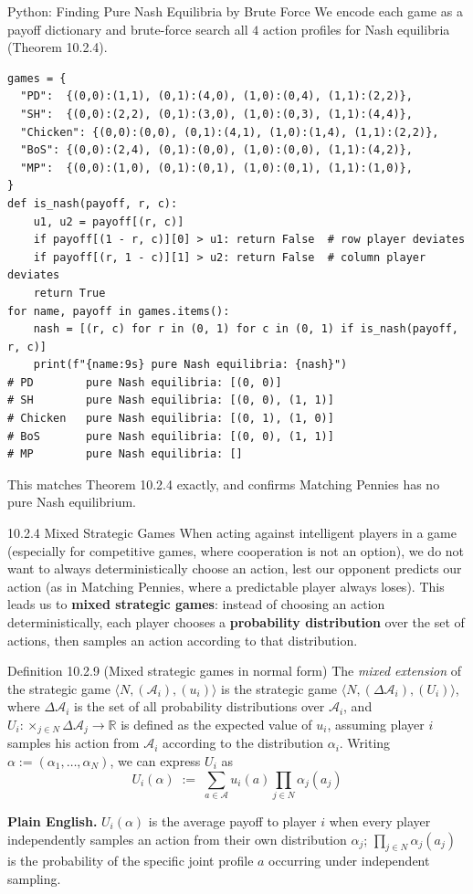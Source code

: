 \documentclass[aspectratio=169,10pt]{beamer}
\newcommand{\R}{\mathbb{R}}
\newcommand{\Ac}{\mathcal{A}}
\begin{document}
\begin{frame}[fragile]{Python: Finding Pure Nash Equilibria by Brute Force}
  We encode each game as a payoff dictionary and brute-force search all
  $4$ action profiles for Nash equilibria (Theorem 10.2.4).
  \begin{lstlisting}[style=pycode]
games = {
  "PD":  {(0,0):(1,1), (0,1):(4,0), (1,0):(0,4), (1,1):(2,2)},
  "SH":  {(0,0):(2,2), (0,1):(3,0), (1,0):(0,3), (1,1):(4,4)},
  "Chicken": {(0,0):(0,0), (0,1):(4,1), (1,0):(1,4), (1,1):(2,2)},
  "BoS": {(0,0):(2,4), (0,1):(0,0), (1,0):(0,0), (1,1):(4,2)},
  "MP":  {(0,0):(1,0), (0,1):(0,1), (1,0):(0,1), (1,1):(1,0)},
}
def is_nash(payoff, r, c):
    u1, u2 = payoff[(r, c)]
    if payoff[(1 - r, c)][0] > u1: return False  # row player deviates
    if payoff[(r, 1 - c)][1] > u2: return False  # column player deviates
    return True
for name, payoff in games.items():
    nash = [(r, c) for r in (0, 1) for c in (0, 1) if is_nash(payoff, r, c)]
    print(f"{name:9s} pure Nash equilibria: {nash}")
# PD        pure Nash equilibria: [(0, 0)]
# SH        pure Nash equilibria: [(0, 0), (1, 1)]
# Chicken   pure Nash equilibria: [(0, 1), (1, 0)]
# BoS       pure Nash equilibria: [(0, 0), (1, 1)]
# MP        pure Nash equilibria: []
  \end{lstlisting}
  This matches Theorem 10.2.4 exactly, and confirms Matching Pennies has
  no pure Nash equilibrium.
\end{frame}

\begin{frame}{10.2.4 Mixed Strategic Games}
  When acting against intelligent players in a game (especially for
  competitive games, where cooperation is not an option), we do not want
  to always deterministically choose an action, lest our opponent predicts
  our action (as in Matching Pennies, where a predictable player always
  loses). This leads us to \textbf{mixed strategic games}: instead of
  choosing an action deterministically, each player chooses a
  \textbf{probability distribution} over the set of actions, then samples
  an action according to that distribution.

  \begin{block}{Definition 10.2.9 (Mixed strategic games in normal form)}
    The \emph{mixed extension} of the strategic game
    $\langle N,(\Ac_i),(u_i)\rangle$ is the strategic game
    $\langle N,(\Delta\Ac_i),(U_i)\rangle$, where $\Delta\Ac_i$ is the set
    of all probability distributions over $\Ac_i$, and
    $U_i:\times_{j\in N}\Delta\Ac_j\to\R$ is defined as the expected value
    of $u_i$, assuming player $i$ samples his action from $\Ac_i$
    according to the distribution $\alpha_i$. Writing
    $\alpha:=(\alpha_1,\ldots,\alpha_N)$, we can express $U_i$ as
    \[
      U_i(\alpha) \;:=\; \sum_{a\in\Ac} u_i(a)\prod_{j\in N}\alpha_j(a_j)
    \]
  \end{block}
  \textbf{Plain English.} $U_i(\alpha)$ is the average payoff to player
  $i$ when every player independently samples an action from their own
  distribution $\alpha_j$; $\prod_{j\in N}\alpha_j(a_j)$ is the probability
  of the specific joint profile $a$ occurring under independent sampling.
\end{frame}
\end{document}
